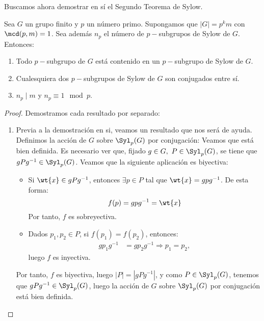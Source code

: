 \begin{ejercicio}
    Buscamos ahora demostrar en sí el Segundo Teorema de Sylow.
    \begin{teo}
        \item Sea $G$ un grupo finito y $p$ un número primo. Supongamos que $|G|=p^k m$ con \(\mcd(p, m) = 1\). Sea además $n_p$ el número de \(p-\)subgrupos de Sylow de \(G\). Entonces:
        \begin{enumerate}
            \item Todo \(p-\)subgrupo de \(G\) está contenido en un \(p-\)subgrupo de Sylow de \(G\).
            \item Cualesquiera dos \(p-\)subgrupos de Sylow de \(G\) son conjugados entre sí.
            \item $n_p\mid m$ y \(n_p \equiv 1 \mod p\).
        \end{enumerate}
        \begin{proof}
            Demostramos cada resultado por separado:
            \begin{enumerate}
                \item Previa a la demostración en si, veamos un resultado que nos será de ayuda. Definimos la acción de \(G\) sobre $\Syl_p(G)$ por conjugación:
                Veamos que está bien definida. Es necesario ver que, fijado $g\in G,\ P\in \Syl_p(G)$, se tiene que \(gPg^{-1}\in \Syl_p(G)\). Veamos que la siguiente aplicación es biyectiva:
                \begin{itemize}
                    \item Si $\wt{x}\in gPg^{-1}$, entonces $\exists p\in P$ tal que $\wt{x} = gpg^{-1}$. De esta forma:
                    \begin{equation*}
                        f(p) = gpg^{-1} = \wt{x}
                    \end{equation*}
                    Por tanto, \(f\) es sobreyectiva.
                    \item Dados $p_1,p_2\in P$, si \(f(p_1) = f(p_2)\), entonces:
                    \begin{align*}
                        g p_1 g^{-1} &= g p_2 g^{-1}
                        \Longrightarrow p_1 = p_2,
                    \end{align*}
                    luego \(f\) es inyectiva.
                \end{itemize}
                Por tanto, \(f\) es biyectiva, luego $|P|=|gPg^{-1}|$, y como $P\in \Syl_p(G)$, tenemos que $gPg^{-1}\in \Syl_p(G)$, luego la acción de \(G\) sobre \(\Syl_p(G)\) por conjugación está bien definida.\\


\end{enumerate}
\end{proof}
\end{teo}
\end{ejercicio}
